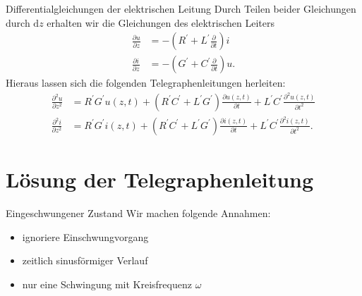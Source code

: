 \documentclass{beamer}
\begin{document}
\begin{frame}{Differentialgleichungen der elektrischen Leitung}
Durch Teilen beider Gleichungen durch $\mathrm{d}z$ erhalten wir die \alert{Gleichungen des elektrischen Leiters}
\begin{align}
    \frac{\partial u}{\partial z} &= -\left(R^{\prime} + L^{\prime}\frac{\partial}{\partial t}\right)i \label{eq:Dgl1}
    \\[1ex]
    \frac{\partial i}{\partial z} &= -\left(G^{\prime} + C^{\prime}\frac{\partial}{\partial t}\right)u. \label{eq:Dgl2}
\end{align}
Hieraus lassen sich die folgenden \alert{Telegraphenleitungen} herleiten:
\begin{align}
    \frac{\partial^{2} u}{\partial z^{2}} &= R^{\prime} G^{\prime} u(z,t) + (R^{\prime} C^{\prime} + L^{\prime}
    G^{\prime}) \frac{\partial u(z, t)}{\partial t} + L^{\prime} C^{\prime} \frac{\partial^{2} u(z,t)}{\partial t^{2}}
    \label{eq:Tele1} \\[1.5ex]
    \frac{\partial^{2} i}{\partial z^{2}} &= R^{\prime} G^{\prime} i(z,t) + (R^{\prime} C^{\prime} + L^{\prime}
    G^{\prime}) \frac{\partial i(z, t)}{\partial t} + L^{\prime} C^{\prime} \frac{\partial^{2} i(z, t)}{\partial t^{2}}.
\end{align}

\end{frame}


\section{Lösung der Telegraphenleitung}


\begin{frame}{Eingeschwungener Zustand}
Wir machen folgende Annahmen:
\begin{itemize}
    \item<1-> ignoriere Einschwungvorgang
    \item<2-> zeitlich sinusförmiger Verlauf
    \item<3-> nur eine Schwingung mit Kreisfrequenz $\omega$
\end{itemize}

\vspace*{1em}

\end{frame}
\end{document}
